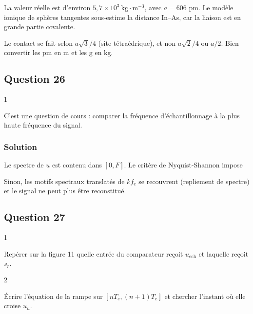 \documentclass[11pt,a4paper]{article}
\newcommand{\equationajustee}[1]{%
  \sbox{\boiteequation}{$\displaystyle #1$}%
  \ifdim\wd\boiteequation>\linewidth
    \[\resizebox{\linewidth}{!}{\usebox{\boiteequation}}\]%
  \else
    \[#1\]%
  \fi}
\begin{document}
La valeur réelle est d'environ \(5{,}7\times10^3\ \text{kg}\cdot\text{m}^{-3}\), avec \(a=606\) pm. Le modèle ionique de sphères tangentes sous-estime la distance In--As, car la liaison est en grande partie covalente.

\begin{piege}

Le contact se fait selon \(a\sqrt3/4\) (site tétraédrique), et non \(a\sqrt2/4\) ou \(a/2\). Bien convertir les pm en m et les g en kg.

\end{piege}

\hypertarget{question-26}{%
\subsection{Question 26}\label{question-26}}

\begin{indication}{1}

C'est une question de cours : comparer la fréquence d'échantillonnage à la plus haute fréquence du signal.

\end{indication}

\hypertarget{solution-25}{%
\subsubsection{Solution}\label{solution-25}}

Le spectre de \(u\) est contenu dans \([0,F]\). Le critère de Nyquist-Shannon impose

\equationajustee{\boxed{f_e=\frac{1}{T_e}>2F}}

Sinon, les motifs spectraux translatés de \(kf_e\) se recouvrent (repliement de spectre) et le signal ne peut plus être reconstitué.

\hypertarget{question-27}{%
\subsection{Question 27}\label{question-27}}

\begin{indication}{1}

Repérer sur la figure 11 quelle entrée du comparateur reçoit \(u_{\text{ech}}\) et laquelle reçoit \(s_r\).

\end{indication}

\begin{indication}{2}

Écrire l'équation de la rampe sur \([nT_e,(n+1)T_e]\) et chercher l'instant où elle croise \(u_n\).

\end{indication}
\end{document}
